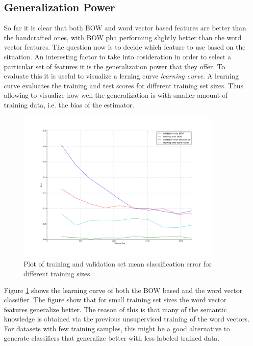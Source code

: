 \subsection{Generalization Power}
\label{sec:sub_w2v4tc_gen_power}

So far it is clear that both \ac{BOW} and word vector based features are
better than the handcrafted ones, with \ac{BOW}  pha performing slightly
better than the word vector features. The question now is to decide which
feature to use based on the situation. An interesting factor to take into
cosideration in order to select a particular set of features it is the
generalization power that they offer.  To evaluate this it is useful to
visualize a lerning curve \textit{learning curve}. A learning curve evaluates
the training and test scores for different training set sizes. Thus allowing
to visualize how well the generalization is with smaller amount of training
data, i.e. the bias of the estimator.


\begin{figure}[hptb!]
	\begin{center}

			\includegraphics[width=0.9\textwidth]{images/plot-models.pdf} 

	\end{center}
	\caption{Plot of training and validation set mean classification  error
          for different training sizes}
	\label{fig:w2v4tc_learning_curve}
\end{figure}

Figure \ref{fig:w2v4tc_learning_curve} shows the learning curve of both the
\ac{BOW} based and the word vector classifier. The figure show that for small
training set sizes the word vector features generalize better. The reason of
this is that many of the semantic knowledge is obtained via the previous unsupervised
training of the word vectors. For datasets with few training samples, this
might be a good alternative to generate classifiers that generalize better
with less labeled trained data.


